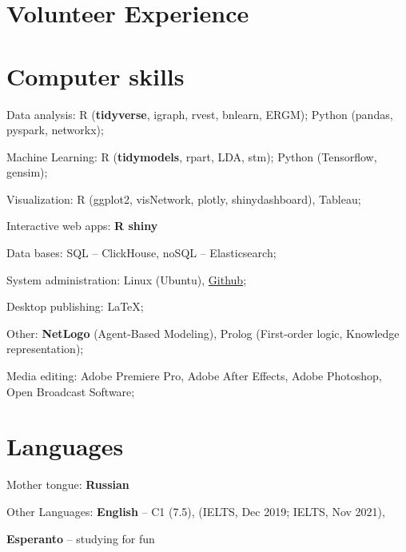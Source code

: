 \documentclass[a4paper, extended]{adcv}
\begin{document}
\section{Volunteer Experience}\label{sec:projects}

\begin{adcvtabletwo}

  \adcvrowskip

\end{adcvtabletwo}

\section{Computer skills}

Data analysis: R (\textbf{tidyverse}, igraph, rvest, bnlearn, ERGM); Python (pandas, pyspark, networkx);

Machine Learning: R (\textbf{tidymodels}, rpart, LDA, stm); Python (Tensorflow, gensim);

Visualization: R (ggplot2, visNetwork, plotly, shinydashboard), Tableau;

Interactive web apps: \textbf{R shiny}

Data bases: SQL -- ClickHouse, noSQL -- Elasticsearch;

System administration: Linux (Ubuntu), \href{https://github.com/vvseva/}{Github};

Desktop publishing: \LaTeX;
  
Other: \textbf{NetLogo} (Agent-Based Modeling), Prolog (First-order logic, Knowledge representation);
  
Media editing: Adobe Premiere Pro, Adobe After Effects, Adobe Photoshop, Open Broadcast Software;
\fi

\section{Languages}

Mother tongue: \textbf{Russian} 

Other Languages: \textbf{English} -- C1 (7.5), (IELTS, Dec 2019; IELTS, Nov 2021), 

\textbf{Esperanto} -- studying for fun


\end{document}
